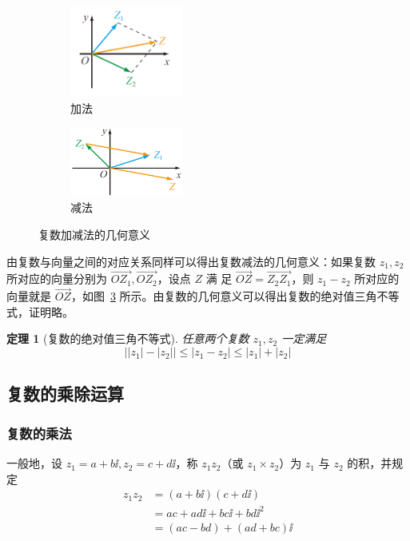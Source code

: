 \documentclass[a4paper,openany]{ctexbook}
\newtheorem{thmlevel1}{定理}
\renewcommand{\vec}{\overrightarrow}
\begin{document}
\begin{figure}
    \centering
    \begin{subfigure}{10em}
        \includegraphics[width=10em]{image4.png}
        \caption{加法}\label{fgr:fuuujxfa}
    \end{subfigure}
    \qquad
    \begin{subfigure}{10em}
        \includegraphics[width=10em]{image5.png}
        \caption{减法}\label{fgr:fuuujmfa}
    \end{subfigure}
    \caption{复数加减法的几何意义}
\end{figure}

由复数与向量之间的对应关系同样可以得出复数减法的几何意义：如果复数 \(z_1,z_2\) 所对应的向量分别为 \(\vec{OZ_1},\vec{OZ_2}\)，设点 \(Z\) 满
足 \(\vec{OZ}=\vec{Z_2Z_1}\)，则 \(z_1-z_2\) 所对应的向量就是 \(\vec{OZ}\)，如图~\ref{fgr:fuuujmfa} 所示。由复数的几何意义可以得出复数的绝对值三角不等式，证明略。

\begin{thmlevel1}[复数的绝对值三角不等式]
    任意两个复数 \(z_1,z_2\) 一定满足
    \[
        \big||z_1|-|z_2|\big|\le |z_1-z_2| \le |z_1|+|z_2|
    \]
\end{thmlevel1}

\subsection{复数的乘除运算}

\subsubsection{复数的乘法}

一般地，设 \(z_1=a+b\ii,z_2=c+d\ii\)，称 \(z_1z_2\)（或 \(z_1\times z_2\)）为 \(z_1\) 与 \(z_2\) 的积，并规定
\begin{align*}
    z_1z_2 & = (a+b\ii)(c+d\ii)       \\
           & = ac+ad\ii+bc\ii+bd\ii^2 \\
           & =(ac-bd)+(ad+bc)\ii
\end{align*}
\end{document}
